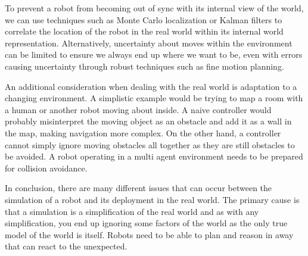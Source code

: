\documentclass{article}
\begin{document}
To prevent a robot from becoming out of sync with its internal view of the world, we can use techniques such as Monte 
Carlo localization or Kalman filters to correlate the location of the robot in the real world within its internal world
representation. Alternatively, uncertainty about moves within the environment can be limited to ensure we always end up
where we want to be, even with errors causing uncertainty through robust techniques such as fine motion planning.

An additional consideration when dealing with the real world is adaptation to a changing environment. A simplistic 
example would be trying to map a room with a human or another robot moving about inside. A naive controller would 
probably misinterpret the moving object as an obstacle and add it as a wall in the map, making navigation more complex. 
On the other hand, a controller cannot simply ignore moving obstacles all together as they are still obstacles to be avoided. 
A robot operating in a multi agent environment needs to be prepared for collision avoidance.

In conclusion, there are many different issues that can occur between the simulation of a robot and its deployment in 
the real world. The primary cause is that a simulation is a simplification of the real world and as with any 
simplification, you end up ignoring some factors of the world as the only true model of the world is itself. Robots need
to be able to plan and reason in away that can react to the unexpected.
\\
\nocite{*}

\end{document}
